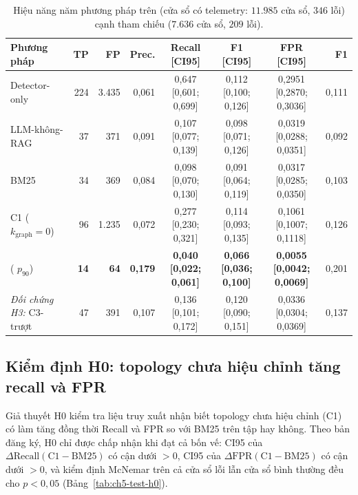 \begin{table}[htbp]
  \centering
  \caption[So sánh tổng quan năm phương pháp trên test cạnh val]{Hiệu năng năm phương pháp trên  (cửa sổ có telemetry: $11.985$ cửa sổ, $346$ lỗi) cạnh tham chiếu  ($7.636$ cửa sổ, $209$ lỗi).}
  \label{tab:ch5-test-overview}
  \scriptsize
  \renewcommand{\arraystretch}{1.15}
  \setlength{\tabcolsep}{2.5pt}
  \begin{tabularx}{\linewidth}{@{}Y r r r c c c r@{}}
    \toprule
    \textbf{Phương pháp} & \textbf{TP} & \textbf{FP} & \textbf{Prec.} & \textbf{Recall [CI95]} & \textbf{F1 [CI95]} & \textbf{FPR [CI95]} & \textbf{ F1} \\
    \midrule
    Detector-only & 224 & 3.435 & 0,061 & 0,647 [0,601; 0,699] & 0,112 [0,100; 0,126] & 0,2951 [0,2870; 0,3036] & 0,111 \\
    LLM-không-RAG & 37 & 371 & 0,091 & 0,107 [0,077; 0,139] & 0,098 [0,071; 0,126] & 0,0319 [0,0288; 0,0351] & 0,092 \\
    BM25 & 34 & 369 & 0,084 & 0,098 [0,070; 0,130] & 0,091 [0,064; 0,119] & 0,0317 [0,0285; 0,0350] & 0,103 \\
    C1 ($k_{\text{graph}} = 0$) & 96 & 1.235 & 0,072 & 0,277 [0,230; 0,321] & 0,114 [0,093; 0,135] & 0,1061 [0,1007; 0,1118] & 0,126 \\
    \textbf{\CTAV{}} ( $p_{90}$) & \textbf{14} & \textbf{64} & \textbf{0,179} & \textbf{0,040 [0,022; 0,061]} & \textbf{0,066 [0,036; 0,100]} & \textbf{0,0055 [0,0042; 0,0069]} & 0,201 \\
    \midrule
    \emph{Đối chứng H3:} C3-trượt & 47 & 391 & 0,107 & 0,136 [0,101; 0,172] & 0,120 [0,090; 0,151] & 0,0336 [0,0304; 0,0369] & 0,137 \\
    \bottomrule
  \end{tabularx}
\end{table}

\subsection{Kiểm định H0: topology chưa hiệu chỉnh tăng recall và FPR}
\label{sec:ch5-test-h0}

Giả thuyết H0 kiểm tra liệu truy xuất nhận biết topology chưa hiệu chỉnh (C1) có làm tăng đồng thời Recall và FPR so với BM25 trên tập  hay không. Theo bản đăng ký, H0 chỉ được chấp nhận khi đạt cả bốn vế: CI95 của $\Delta\text{Recall}(\text{C1}-\text{BM25})$ có cận dưới $> 0$, CI95 của $\Delta\text{FPR}(\text{C1}-\text{BM25})$ có cận dưới $> 0$, và kiểm định McNemar trên cả cửa sổ lỗi lẫn cửa sổ bình thường đều cho $p < 0{,}05$ (Bảng~\ref{tab:ch5-test-h0}).

